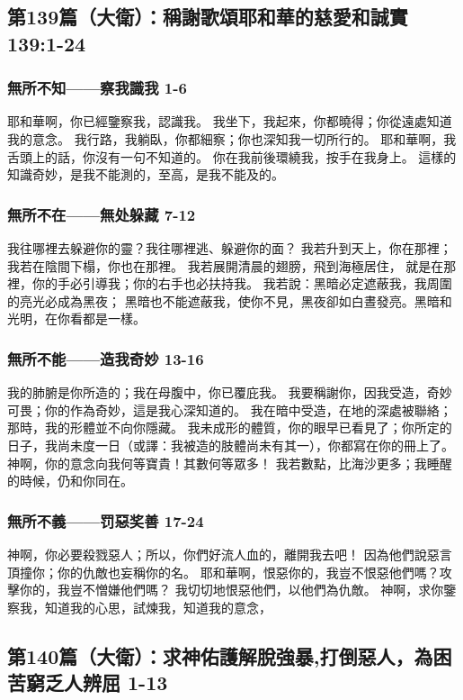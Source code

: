 \subsection{第139篇（大衛）：稱謝歌頌耶和華的慈愛和誠實 139:1-24}
\subsubsection{無所不知——察我識我 1-6}
耶和華啊，你已經鑒察我，認識我。
我坐下，我起來，你都曉得；你從遠處知道我的意念。
我行路，我躺臥，你都細察；你也深知我一切所行的。
耶和華啊，我舌頭上的話，你沒有一句不知道的。
你在我前後環繞我，按手在我身上。
這樣的知識奇妙，是我不能測的，至高，是我不能及的。

\subsubsection{無所不在——無处躲藏 7-12}
我往哪裡去躲避你的靈？我往哪裡逃、躲避你的面？
我若升到天上，你在那裡；我若在陰間下榻，你也在那裡。
我若展開清晨的翅膀，飛到海極居住，
就是在那裡，你的手必引導我；你的右手也必扶持我。
我若說：黑暗必定遮蔽我，我周圍的亮光必成為黑夜；
黑暗也不能遮蔽我，使你不見，黑夜卻如白晝發亮。黑暗和光明，在你看都是一樣。

\subsubsection{無所不能——造我奇妙 13-16}
我的肺腑是你所造的；我在母腹中，你已覆庇我。
我要稱謝你，因我受造，奇妙可畏；你的作為奇妙，這是我心深知道的。
我在暗中受造，在地的深處被聯絡；那時，我的形體並不向你隱藏。
我未成形的體質，你的眼早已看見了；你所定的日子，我尚未度一日（或譯：我被造的肢體尚未有其一），你都寫在你的冊上了。
神啊，你的意念向我何等寶貴！其數何等眾多！
我若數點，比海沙更多；我睡醒的時候，仍和你同在。

\subsubsection{無所不義——罚惡奖善 17-24}
神啊，你必要殺戮惡人；所以，你們好流人血的，離開我去吧！
因為他們說惡言頂撞你；你的仇敵也妄稱你的名。
耶和華啊，恨惡你的，我豈不恨惡他們嗎？攻擊你的，我豈不憎嫌他們嗎？
我切切地恨惡他們，以他們為仇敵。
神啊，求你鑒察我，知道我的心思，試煉我，知道我的意念，


\subsection{第140篇（大衛）：求神佑護解脫強暴,打倒惡人，為困苦窮乏人辨屈 1-13}
